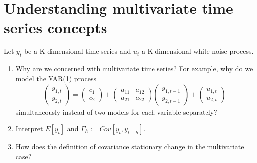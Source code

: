 \section[Understanding multivariate time series concepts]{Understanding multivariate time series concepts\label{ex:UnderstandingMultivariateTimeSeriesConcepts}}
Let \(y_t\) be a K-dimensional time series and \(u_t\) a K-dimensional white noise process.
\begin{enumerate}
\item Why are we concerned with multivariate time series?
For example, why do we model the VAR(1) process
\begin{align*}
\begin{pmatrix}y_{1,t}\\ y_{2,t}\end{pmatrix} = \begin{pmatrix} c_1 \\ c_2\end{pmatrix} + \begin{pmatrix}a_{11} & a_{12}\\ a_{21} & a_{22} \end{pmatrix} \begin{pmatrix}y_{1,{t-1}}\\ y_{2,{t-1}}\end{pmatrix} + \begin{pmatrix}u_{1,t}\\ u_{2,t}\end{pmatrix}
\end{align*}
simultaneously instead of two models for each variable separately?

\item Interpret \(E[y_t]\) and \(\Gamma_h := Cov[y_{t},y_{t-h}]\).

\item How does the definition of covariance stationary change in the multivariate case?


\end{enumerate}
